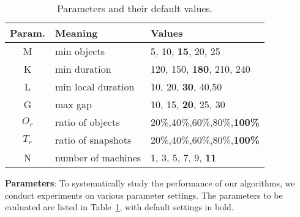 \begin{table}[h]
\caption{Parameters and their default values.}
\label{tbl:parameters}
\begin{tabular}{c|l|p{3.3cm}}
\hline 
\textbf{Param.} & \textbf{Meaning} & \textbf{Values} \\ 
\hline 
M & min  objects &  5, 10,  \textbf{15}, 20, 25 \\ 
\hline 
K & min duration & 120, 150, \textbf{180}, 210, 240 \\ 
\hline 
L & min local duration & 10, 20, \textbf{30}, 40,50 \\ 
\hline 
G & max gap & 10, 15, \textbf{20}, 25, 30 \\ 
\hline
$O_r$ & ratio of objects & 20\%,40\%,60\%,80\%,\textbf{100\%} \\ \hline
$T_r$ & ratio of snapshots & 20\%,40\%,60\%,80\%,\textbf{100\%} \\ \hline
N & number of machines & 1, 3, 5, 7, 9, \textbf{11}\\ 
\hline 
\end{tabular} 
\end{table}



\textbf{Parameters}: To systematically study the performance of
our algorithms, we conduct experiments on various parameter settings. The parameters to be evaluated are listed in Table~\ref{tbl:parameters}, with default settings in bold. 

